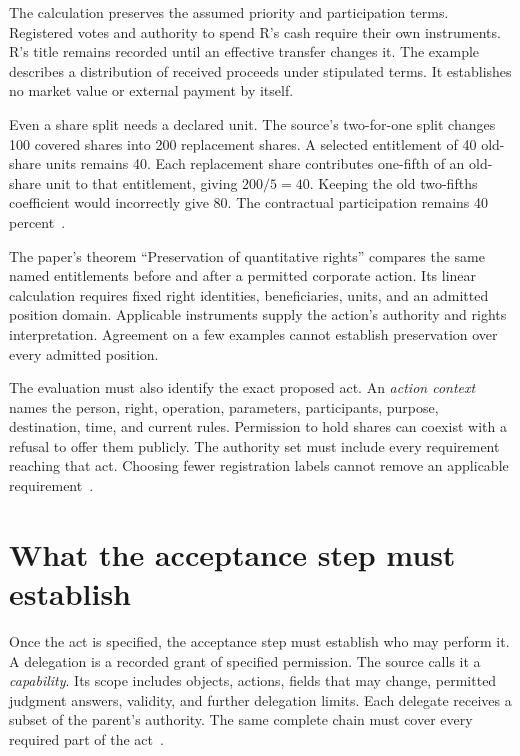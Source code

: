 \documentclass{momentum}
\begin{document}
The calculation preserves the assumed priority and participation terms.
Registered votes and authority to spend R's cash require their own instruments.
R's title remains recorded until an effective transfer changes it.
The example describes a distribution of received proceeds under stipulated terms.
It establishes no market value or external payment by itself.

Even a share split needs a declared unit.
The source's two-for-one split changes 100 covered shares into 200 replacement shares.
A selected entitlement of 40 old-share units remains 40.
Each replacement share contributes one-fifth of an old-share unit to that entitlement, giving \(200/5=40\).
Keeping the old two-fifths coefficient would incorrectly give 80.
The contractual participation remains 40 percent~\cite[Section~2, ``A split with retained participation'']{entity}.

The paper's theorem ``Preservation of quantitative rights'' compares the same named entitlements before and after a permitted corporate action.
Its linear calculation requires fixed right identities, beneficiaries, units, and an admitted position domain.
Applicable instruments supply the action's authority and rights interpretation.
Agreement on a few examples cannot establish preservation over every admitted position.

The evaluation must also identify the exact proposed act.
An \emph{action context} names the person, right, operation, parameters, participants, purpose, destination, time, and current rules.
Permission to hold shares can coexist with a refusal to offer them publicly.
The authority set must include every requirement reaching that act.
Choosing fewer registration labels cannot remove an applicable requirement~\cite[Section~2, ``Scoped action'']{entity}.

\section{What the acceptance step must establish}
\label{sec:acceptance}

Once the act is specified, the acceptance step must establish who may perform it. A delegation is a recorded grant of specified permission.
The source calls it a \emph{capability}.
Its scope includes objects, actions, fields that may change, permitted judgment answers, validity, and further delegation limits.
Each delegate receives a subset of the parent's authority.
The same complete chain must cover every required part of the act~\cite[Section~3.1]{institutions}.
\end{document}
